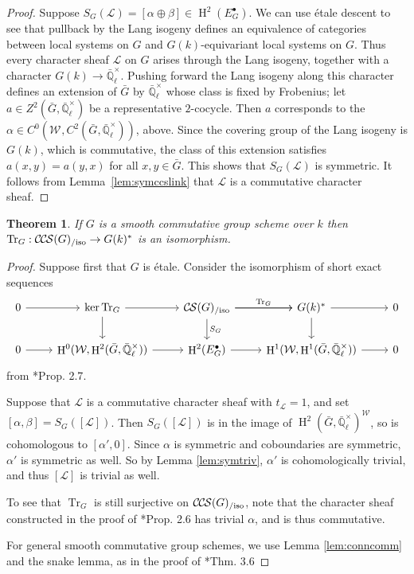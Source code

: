 \documentclass[10pt]{amsart}
\theoremstyle{plain}
\newtheorem{theorem}{Theorem}[section]
\theoremstyle{definition}
\newcommand{\EE}{\mathbb{\bar Q}_\ell}
\newcommand{\Fq}{k}
\newcommand{\EEx}{\EE^\times}
\newcommand{\Weil}[1]{\mathcal{W}_{#1}}
\DeclareMathOperator{\Hh}{H}
\newcommand{\trFrob}[1]{t_{#1}}
\DeclareMathOperator{\Tr}{Tr}
\newcommand{\TrFrob}[1]{\Tr_{#1}}
\newcommand{\cs}[1]{{\mathcal{#1}}}
\newcommand{\CS}{{\mathcal{C\hskip-0.8pt S}}}
\newcommand{\CCS}{{\mathcal{C\hskip-.8pt C\hskip-0.8pt S}}}
\newcommand{\CSiso}[1]{\CS(#1)_{/\text{iso}}}
\newcommand{\CCSiso}[1]{\CCS(#1)_{/\text{iso}}}
\newcommand{\bG}{\bar{G}}
\begin{document}
\begin{proof}
Suppose $S_G(\cs{L}) = [\alpha\oplus \beta]\in \Hh^2(E_G^\bullet)$.
We can use \'etale descent to see that pullback by the Lang isogeny defines an equivalence
of categories between local systems on $G$ and $G(\Fq)$-equivariant local systems on $G$.  
Thus every character sheaf $\cs{L}$ on $G$ arises through the Lang isogeny, together with a character $G(\Fq) \to \EEx$.
Pushing forward the Lang isogeny along this character defines an extension of $\bG$ by $\EEx$ whose class is fixed by Frobenius; let $a\in Z^2(\bG, \EEx)$ be a representative $2$-cocycle.
Then $a$ corresponds to the $\alpha \in C^0(\Weil{}, C^2(\bG, \EEx))$, above. 
Since the covering group of the Lang isogeny is $G(k)$, which is commutative, the class of this extension satisfies $a(x,y) = a(y,x)$ for all $x,y \in \bG$. 
This shows that $S_{G}(\cs{L})$ is symmetric.
It follows from Lemma~\ref{lem:symccslink} that $\cs{L}$ is a commutative character sheaf.
\end{proof}

\begin{theorem} \label{thm:trfrobiso}
If $G$ is a smooth commutative group scheme over $\Fq$ then $\TrFrob{G} : \CCSiso{G} \to G(\Fq)^*$ is an isomorphism.
\end{theorem}

\begin{proof}
Suppose first that $G$ is \'etale.  Consider the isomorphism of short exact sequences
\[
\begin{tikzcd}
 0 \arrow{r} & \ker \TrFrob{G} \arrow{d} \arrow{r} & \CSiso{G}\arrow{d}{S_G} \arrow{r}{\TrFrob{G}} \arrow{r} & G(\Fq)^* \arrow{d} \arrow{r} & 0\\
  0 \arrow{r} & \Hh^0(\Weil{},\Hh^2(\bG,\EEx)) \arrow{r} & \Hh^2(E^\bullet_G) \arrow{r} & \Hh^1(\Weil{},\Hh^1(\bG,\EEx)) \arrow{r} & 0
 \end{tikzcd}
 \]
from \cite{cunningham-roe:13a}*{Prop. 2.7}.

Suppose that $\cs{L}$ is a commutative character sheaf with $\trFrob{\cs{L}} = 1$, and set $[\alpha, \beta] = S_G([\cs{L}])$.
Then $S_G([\cs{L}])$ is in the image of $\Hh^2(\bG, \EEx)^\Weil{}$, so is cohomologous to
$[\alpha', 0]$.  Since $\alpha$ is symmetric and coboundaries are symmetric, $\alpha'$ is symmetric as well.
So by Lemma \ref{lem:symtriv}, $\alpha'$ is cohomologically trivial, and thus $[\cs{L}]$ is trivial as well.

To see that $\TrFrob{G}$ is still surjective on $\CCSiso{G}$, note that the character sheaf constructed in the proof of
\cite{cunningham-roe:13a}*{Prop. 2.6} has trivial $\alpha$, and is thus commutative.

For general smooth commutative group schemes, we use Lemma \ref{lem:conncomm} and the snake lemma, as in the proof of
\cite{cunningham-roe:13a}*{Thm. 3.6}
\end{proof}
\end{document}
